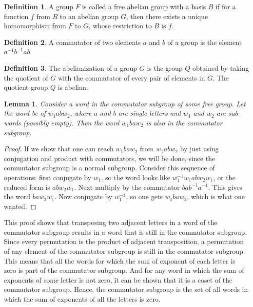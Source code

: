 \documentclass[12pt]{article}
\newtheorem{lem}[thm]{Lemma}
\theoremstyle{definition}
\newtheorem{defn}{Definition}[section]
\begin{document}
\begin{defn}
A group $F$ is called a free abelian group with a basis $B$ if for a function $f$ from $B$ to an abelian group $G$, then there exists a unique homomorphism from $F$ to $G$, whose restriction to $B$ is $f$.
\end{defn}

\begin{defn}
A commutator of two elements $a$ and $b$ of a group is the element $a^{-1}b^{-1}ab$.
\end{defn}

\begin{defn}
The abelianization of a group $G$ is the group $Q$ obtained by taking the quotient of $G$ with the commutator of every pair of elements in $G$. The quotient group $Q$ is abelian.
\end{defn}

\begin{lem}\label{commu}
Consider a word in the commutator subgroup of some free group. Let the word be of $w_1abw_2$, where $a$ and $b$ are single letters and $w_1$ and $w_2$ are sub-words (possibly empty). Then the word $w_1baw_2$ is also in the commutator subgroup.
\end{lem}

\begin{proof}
If we show that one can reach $w_1baw_2$ from $w_1abw_2$ by just using conjugation and product with commutators, we will be done, since the commutator subgroup is a normal subgroup. Consider this sequence of operations: first conjugate by $w_1$, so the word looks like $w_1^{-1}w_1abw_2w_1$, or the reduced form is $abw_2w_1$. Next multiply by the commutator $bab^{-1}a^{-1}$. This gives the word $baw_2w_1$. Now conjugate by $w_1^{-1}$, so one gets $w_1baw_2$, which is what one wanted.
\end{proof}

This proof shows that transposing two adjacent letters in a word of the commutator subgroup results in a word that is still in the commutator subgroup. Since every permutation is the product of adjacent transposition, a permutation of any element of the commutator subgroup is still in the commutator subgroup. This means that all the words for which the sum of exponent of each letter is zero is part of the commutator subgroup. And for any word in which the sum of exponents of some letter is not zero, it can be shown that it is a coset of the commutator subgroup. Hence, the commutator subgroup is the set of all words in which the sum of exponents of all the letters is zero.
\end{document}
